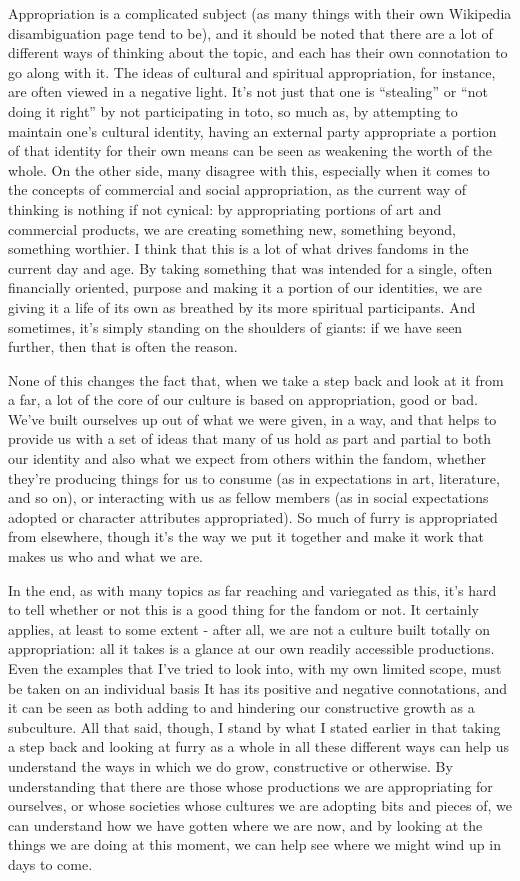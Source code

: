 Appropriation is a complicated subject (as many things with their own Wikipedia disambiguation page tend to be), and it should be noted that there are a lot of different ways of thinking about the topic, and each has their own connotation to go along with it. The ideas of cultural and spiritual appropriation, for instance, are often viewed in a negative light. It's not just that one is ``stealing'' or ``not doing it right'' by not participating in toto, so much as, by attempting to maintain one's cultural identity, having an external party appropriate a portion of that identity for their own means can be seen as weakening the worth of the whole. On the other side, many disagree with this, especially when it comes to the concepts of commercial and social appropriation, as the current way of thinking is nothing if not cynical: by appropriating portions of art and commercial products, we are creating something new, something beyond, something worthier. I think that this is a lot of what drives fandoms in the current day and age. By taking something that was intended for a single, often financially oriented, purpose and making it a portion of our identities, we are giving it a life of its own as breathed by its more spiritual participants. And sometimes, it's simply standing on the shoulders of giants: if we have seen further, then that is often the reason.

None of this changes the fact that, when we take a step back and look at it from a far, a lot of the core of our culture is based on appropriation, good or bad. We've built ourselves up out of what we were given, in a way, and that helps to provide us with a set of ideas that many of us hold as part and partial to both our identity and also what we expect from others within the fandom, whether they're producing things for us to consume (as in expectations in art, literature, and so on), or interacting with us as fellow members (as in social expectations adopted or character attributes appropriated). So much of furry is appropriated from elsewhere, though it's the way we put it together and make it work that makes us who and what we are.

In the end, as with many topics as far reaching and variegated as this, it's hard to tell whether or not this is a good thing for the fandom or not. It certainly applies, at least to some extent - after all, we are not a culture built totally on appropriation: all it takes is a glance at our own readily accessible productions. Even the examples that I've tried to look into, with my own limited scope, must be taken on an individual basis It has its positive and negative connotations, and it can be seen as both adding to and hindering our constructive growth as a subculture. All that said, though, I stand by what I stated earlier in that taking a step back and looking at furry as a whole in all these different ways can help us understand the ways in which we do grow, constructive or otherwise. By understanding that there are those whose productions we are appropriating for ourselves, or whose societies whose cultures we are adopting bits and pieces of, we can understand how we have gotten where we are now, and by looking at the things we are doing at this moment, we can help see where we might wind up in days to come.

